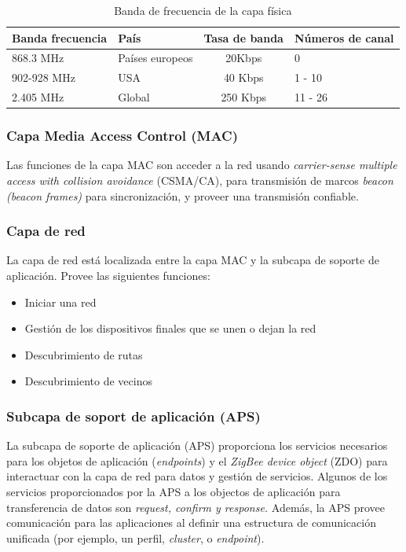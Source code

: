 \documentclass[10pt,journal,compsoc]{IEEEtran}
\begin{document}
\begin{table}[h!]
    \centering
    \begin{tabular}{llcl}
        \toprule[1.5pt]
        Banda frecuencia & País & Tasa de banda & Números de canal\\
        \midrule
        868.3 MHz & Países europeos & 20Kbps & 0 \\
        902-928 MHz & USA & 40 Kbps & 1 - 10 \\
        2.405 MHz & Global & 250 Kbps & 11 - 26 \\
        \bottomrule[1.5pt]
    \end{tabular}
    \caption{Banda de frecuencia de la capa física}
    \label{table:1}
\end{table}

\subsubsection{Capa Media Access Control (MAC)}
Las funciones de la capa MAC son acceder a la red usando \emph{carrier-sense multiple access with collision avoidance} (CSMA/CA), para transmisión de marcos \emph{beacon (beacon frames)} para sincronización, y proveer una transmisión confiable.

\subsubsection{Capa de red}
La capa de red está localizada entre la capa MAC y la subcapa de soporte de aplicación. Provee las siguientes funciones:
\begin{itemize}
    \item Iniciar una red
    \item Gestión de los dispositivos finales que se unen o dejan la red
    \item Descubrimiento de rutas
    \item Descubrimiento de vecinos
\end{itemize}

\subsubsection{Subcapa de soport de aplicación (APS)}
La subcapa de soporte de aplicación (APS) proporciona los servicios necesarios para los objetos de aplicación (\emph{endpoints}) y el \emph{ZigBee device object} (ZDO) para interactuar con la capa de red para datos y gestión de servicios. Algunos de los servicios proporcionados por la APS a los objectos de aplicación para transferencia de datos son \emph{request, confirm \textnormal{y} response.} Además, la APS provee comunicación para las aplicaciones al definir una estructura de comunicación unificada (por ejemplo, un perfil, \emph{cluster}, o \emph{endpoint}).
\end{document}

